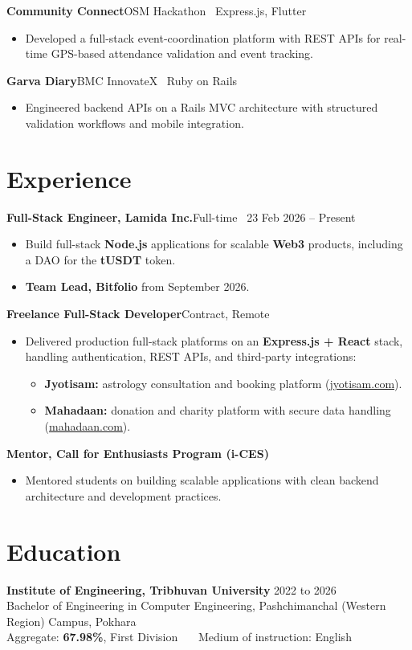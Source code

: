 \documentclass[a4paper,10pt]{article}
\newcommand{\project}[2]{\textbf{#1}\hfill{\color{rulegray}\small #2}\par\vspace{1pt}}
\begin{document}
\project{Community Connect}{OSM Hackathon \textbar\ Express.js, Flutter}
\begin{itemize}
\item Developed a full-stack event-coordination platform with REST APIs for real-time GPS-based attendance validation and event tracking.
\end{itemize}

\project{Garva Diary}{BMC InnovateX \textbar\ Ruby on Rails}
\begin{itemize}
\item Engineered backend APIs on a Rails MVC architecture with structured validation workflows and mobile integration.
\end{itemize}

\section*{Experience}

\project{Full-Stack Engineer, Lamida Inc.}{Full-time \textbar\ 23 Feb 2026 -- Present}
\begin{itemize}
\item Build full-stack \textbf{Node.js} applications for scalable \textbf{Web3} products, including a DAO for the \textbf{tUSDT} token.
\item \textbf{Team Lead, Bitfolio} from September 2026.
\end{itemize}

\project{Freelance Full-Stack Developer}{Contract, Remote}
\begin{itemize}
\item Delivered production full-stack platforms on an \textbf{Express.js + React} stack, handling authentication, REST APIs, and third-party integrations:
\begin{itemize}
\item \textbf{Jyotisam:} astrology consultation and booking platform (\href{https://jyotisam.com}{jyotisam.com}).
\item \textbf{Mahadaan:} donation and charity platform with secure data handling (\href{https://mahadaan.com}{mahadaan.com}).
\end{itemize}
\end{itemize}

\project{Mentor, Call for Enthusiasts Program (i-CES)}{}
\begin{itemize}
\item Mentored students on building scalable applications with clean backend architecture and development practices.
\end{itemize}

\section*{Education}

\textbf{Institute of Engineering, Tribhuvan University} \hfill 2022 to 2026\\
Bachelor of Engineering in Computer Engineering, Pashchimanchal (Western Region) Campus, Pokhara\\
Aggregate: \textbf{67.98\%}, First Division \ \textbar\ \ Medium of instruction: English
\end{document}

